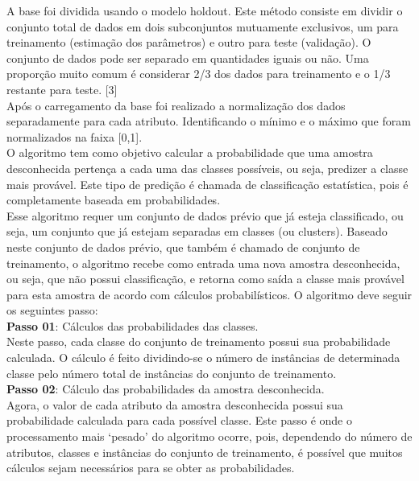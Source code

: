 \documentclass[a4paper]{article}
\begin{document}
A base foi dividida usando o modelo holdout. Este método consiste em dividir o conjunto total de dados em dois subconjuntos mutuamente exclusivos, um para treinamento (estimação dos parâmetros) e outro para teste (validação). O conjunto de dados pode ser separado em quantidades iguais ou não. Uma proporção muito comum é considerar 2/3 dos dados para treinamento e o 1/3 restante para teste. [3]\\

Após o carregamento da base foi realizado a normalização dos dados separadamente para cada atributo. Identificando o mínimo e o máximo que foram normalizados na faixa [0,1].\\

O algoritmo tem como objetivo calcular a probabilidade que uma amostra desconhecida pertença a cada uma das classes possíveis, ou seja, predizer a classe mais provável. Este tipo de predição é chamada de classificação estatística, pois é completamente baseada em probabilidades. \\

Esse algoritmo requer um conjunto de dados prévio que já esteja classificado, ou seja, um conjunto que já estejam separadas em classes (ou clusters). Baseado neste conjunto de dados prévio, que também é chamado de conjunto de treinamento, o algoritmo recebe como entrada uma nova amostra desconhecida, ou seja, que não possui classificação, e retorna como saída a classe mais provável para esta amostra de acordo com cálculos probabilísticos. O algoritmo deve seguir os seguintes passo:\\


\textbf{Passo 01}: Cálculos das probabilidades das classes.\\

Neste passo, cada classe do conjunto de treinamento possui sua probabilidade calculada. O cálculo é feito dividindo-se o número de instâncias de determinada classe pelo número total de instâncias do conjunto de treinamento.\\

\textbf{Passo 02}: Cálculo das probabilidades da amostra desconhecida.\\

Agora, o valor de cada atributo da amostra desconhecida possui sua probabilidade calculada para cada possível classe. Este passo é onde o processamento mais ‘pesado’ do algoritmo ocorre, pois, dependendo do número de atributos, classes e instâncias do conjunto de treinamento, é possível que muitos cálculos sejam necessários para se obter as probabilidades.\\
\end{document}
